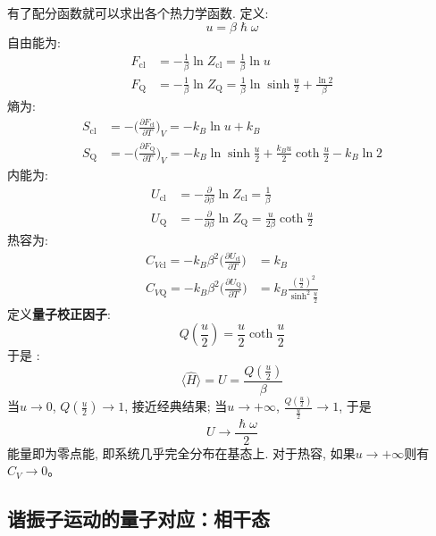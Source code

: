     有了配分函数就可以求出各个热力学函数. 定义: 
    \[ u = \beta\hslash\omega \]
    自由能为:
    \begin{equation}\begin{aligned}
        F_\mathrm{cl} &= -\frac 1{\beta} \ln{Z_\mathrm{cl}} = \frac 1{\beta} \ln{u}\\
        F_\mathrm{Q} &= -\frac 1{\beta} \ln{Z_\mathrm{Q}} = \frac 1{\beta}\ln{\sinh{\frac u2}}+ \frac {\ln{2}}{\beta}
    \end{aligned}\end{equation}
    熵为:
    \begin{equation}\begin{aligned}
        S_\mathrm{cl} &= -\bigg(\frac {\partial F_{\mathrm{cl}}}{\partial T}\bigg)_V = -k_B \ln{u} + k_B\\
        S_\mathrm{Q} &= -\bigg(\frac {\partial F_{\mathrm{Q}}}{\partial T}\bigg)_V = -k_B \ln{\sinh{\frac u2}} + \frac {k_Bu}2 \coth{\frac u2} - k_B \ln{2}
    \end{aligned}\end{equation}
    内能为:
    \begin{equation}\begin{aligned}
        U_\mathrm{cl} &= -\frac {\partial}{\partial \beta}\ln{Z_\mathrm{cl}} = \frac 1{\beta}\\
        U_\mathrm{Q} &= -\frac {\partial}{\partial \beta}\ln{Z_\mathrm{Q}} = \frac {u}{2\beta} \coth{\frac u2}
    \end{aligned}\end{equation}
    热容为:
    \begin{equation}\begin{aligned}
        C_{V\mathrm{cl}} = -k_B \beta^2 \bigg(\frac {\partial U_\mathrm{cl}}{\partial T}) &= k_B\\
        C_{V\mathrm{Q}} = -k_B \beta^2 \bigg(\frac {\partial U_\mathrm{Q}}{\partial T}) &= k_B \frac {(\frac u2)^2}{\sinh^2{\frac u2}}
    \end{aligned}\end{equation}
    定义\textbf{量子校正因子}:
    \[ Q(\frac u2) = \frac u2 \coth{\frac u2} \]
    于是 :
    \[ \langle \hat{H} \rangle = U = \frac {Q(\frac u2)}{\beta} \]
    当$u \to 0$, $Q(\frac u2) \to 1$, 接近经典结果; 当$u \to +\infty$, $\frac {Q(\frac u2)}{\frac u2} \to 1$, 于是
    \[U \to \frac {\hslash \omega}2 \]
    能量即为零点能, 即系统几乎完全分布在基态上.
    对于热容, 如果$u \to +\infty$则有$C_V \to 0$。

    \subsection{谐振子运动的量子对应：相干态}

